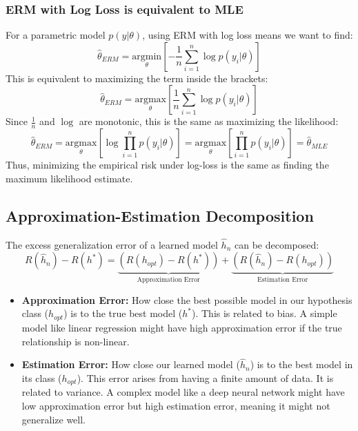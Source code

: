 \documentclass{article}
\begin{document}
\begin{multicols}{2}
	\subsubsection{ERM with Log Loss is equivalent to MLE}
	For a parametric model $p(y|\theta)$, using ERM with log loss means we want to find:
	$$ \hat{\theta}_{ERM} = \underset{\theta}{\text{argmin}} \left[ -\frac{1}{n} \sum_{i=1}^{n} \log p(y_i|\theta) \right] $$
	This is equivalent to maximizing the term inside the brackets:
	$$ \hat{\theta}_{ERM} = \underset{\theta}{\text{argmax}} \left[ \frac{1}{n} \sum_{i=1}^{n} \log p(y_i|\theta) \right] $$
	Since $\frac{1}{n}$ and $\log$ are monotonic, this is the same as maximizing the likelihood:
	$$ \hat{\theta}_{ERM} = \underset{\theta}{\text{argmax}} \left[ \log \prod_{i=1}^{n} p(y_i|\theta) \right] = \underset{\theta}{\text{argmax}} \left[ \prod_{i=1}^{n} p(y_i|\theta) \right] = \hat{\theta}_{MLE} $$
	Thus, minimizing the empirical risk under log-loss is the same as finding the maximum likelihood estimate.

	\subsection{Approximation-Estimation Decomposition}
	The excess generalization error of a learned model $\hat{h}_n$ can be decomposed:
	$$ R(\hat{h}_n) - R(h^*) = \underbrace{(R(h_{opt}) - R(h^*))}_{\text{Approximation Error}} + \underbrace{(R(\hat{h}_n) - R(h_{opt}))}_{\text{Estimation Error}} $$
	\begin{itemize}
		\item \textbf{Approximation Error:} How close the best possible model in our hypothesis class ($h_{opt}$) is to the true best model ($h^*$). This is related to bias. A simple model like linear regression might have high approximation error if the true relationship is non-linear.
		\item \textbf{Estimation Error:} How close our learned model ($\hat{h}_n$) is to the best model in its class ($h_{opt}$). This error arises from having a finite amount of data. It is related to variance. A complex model like a deep neural network might have low approximation error but high estimation error, meaning it might not generalize well.
	\end{itemize}


\end{multicols}
\end{document}
